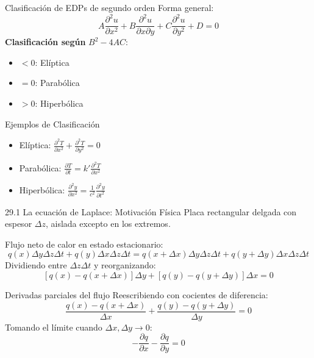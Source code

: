 \documentclass[main.tex]{subfiles}
\begin{document}
\begin{frame}{Clasificación de EDPs de segundo orden}
\small
Forma general:
\[
A \frac{\partial^2 u}{\partial x^2} + B \frac{\partial^2 u}{\partial x \partial y} + C \frac{\partial^2 u}{\partial y^2} + D = 0
\]
\textbf{Clasificación según } \( B^2 - 4AC \):
\begin{itemize}
  \item \( < 0 \): Elíptica
  \item \( = 0 \): Parabólica
  \item \( > 0 \): Hiperbólica
\end{itemize}
\end{frame}

\begin{frame}{Ejemplos de Clasificación}
\small
\begin{itemize}
  \item Elíptica: \( \frac{\partial^2 T}{\partial x^2} + \frac{\partial^2 T}{\partial y^2} = 0 \)
  \item Parabólica: \( \frac{\partial T}{\partial t} = k' \frac{\partial^2 T}{\partial x^2} \)
  \item Hiperbólica: \( \frac{\partial^2 y}{\partial x^2} = \frac{1}{c^2} \frac{\partial^2 y}{\partial t^2} \)
\end{itemize}
\end{frame}

\begin{frame}{29.1 La ecuación de Laplace: Motivación Física}
\small
Placa rectangular delgada con espesor \(\Delta z\), aislada excepto en los extremos.

Flujo neto de calor en estado estacionario:
\[
q(x) \Delta y \Delta z \Delta t + q(y) \Delta x \Delta z \Delta t = q(x + \Delta x) \Delta y \Delta z \Delta t + q(y + \Delta y) \Delta x \Delta z \Delta t
\]
Dividiendo entre \( \Delta z \Delta t \) y reorganizando:
\[
[q(x) - q(x + \Delta x)] \Delta y + [q(y) - q(y + \Delta y)] \Delta x = 0
\]
\end{frame}

\begin{frame}{Derivadas parciales del flujo}
\small
Reescribiendo con cocientes de diferencia:
\[
\frac{q(x) - q(x + \Delta x)}{\Delta x} + \frac{q(y) - q(y + \Delta y)}{\Delta y} = 0
\]
Tomando el límite cuando \( \Delta x, \Delta y \to 0 \):
\[
-\frac{\partial q}{\partial x} - \frac{\partial q}{\partial y} = 0
\]
\end{frame}
\end{document}
